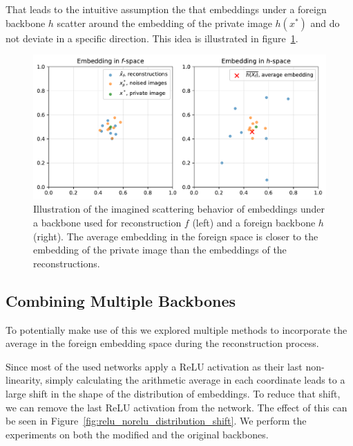\documentclass[10pt,twocolumn]{article}
\begin{document}
That leads to the intuitive assumption the that embeddings under a foreign backbone $h$ scatter around the embedding of the private image $h(x^*)$ and do not deviate in a specific direction.
This idea is illustrated in figure~\ref{fig:avg_embedding_sketch}.
\begin{figure}[ht]
    \centering
    \includegraphics[width=\linewidth]{figures/avg-embedding-sketch}
    \caption{
       Illustration of the imagined scattering behavior of embeddings under a backbone used for reconstruction $f$ (left) and a foreign backbone $h$ (right).
       The average embedding in the foreign space is closer to the embedding of the private image than the embeddings of the reconstructions.
    }
    \label{fig:avg_embedding_sketch}
\end{figure}

\subsection{Combining Multiple Backbones}\label{combining_backbones}
To potentially make use of this we explored multiple methods to incorporate the average in the foreign embedding space during the reconstruction process.

Since most of the used networks apply a ReLU activation as their last non-linearity, simply calculating the arithmetic average in each coordinate leads to a large shift in the shape of the distribution of embeddings.
To reduce that shift, we can remove the last ReLU activation from the network.
The effect of this can be seen in Figure~\ref{fig:relu_norelu_distribution_shift}.
We perform the experiments on both the modified and the original backbones.
\end{document}
